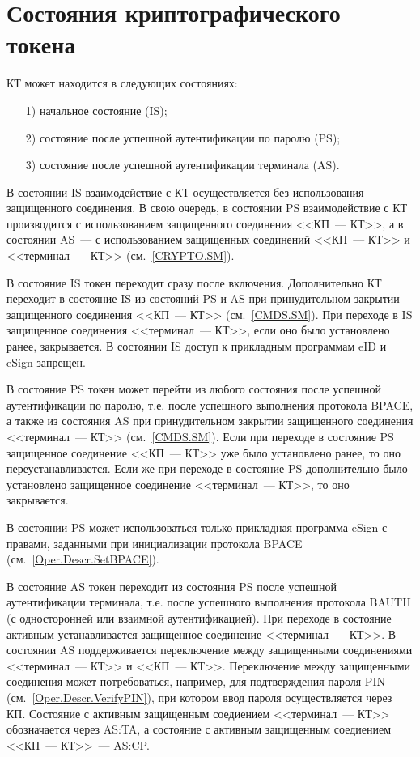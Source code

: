 \chapter{Состояния криптографического токена}\label{STATES}

КТ может находится в следующих состояниях:
%
\begin{itemize}
\item[1)]
начальное состояние (IS);
\item[2)]
состояние после успешной аутентификации по паролю (PS);
\item[3)]
состояние после успешной аутентификации терминала (AS).
\end{itemize}

В состоянии IS взаимодействие с КТ осуществляется без использования 
защищенного соединения. В свою очередь, в состоянии PS взаимодействие 
с КТ производится с использованием защищенного соединения <<КП~--- КТ>>, 
а в состоянии AS~--- с использованием защищенных соединений <<КП~--- КТ>> 
и <<терминал~--- КТ>> (см.~\ref{CRYPTO.SM}).

В состояние IS токен переходит сразу после включения.
Дополнительно КТ переходит в состояние IS из состояний PS и AS
при принудительном закрытии защищенного соединения <<КП~--- КТ>> (см.~\ref{CMDS.SM}).
При переходе в IS защищенное соединения <<терминал~--- КТ>>, 
если оно было установлено ранее, закрывается.
В состоянии IS доступ к прикладным программам eID и eSign запрещен.

В состояние PS токен может перейти из любого состояния 
после успешной аутентификации по паролю, 
т.е. после успешного выполнения протокола BPACE,
а также из состояния AS при принудительном закрытии 
защищенного соединения <<терминал~--- КТ>> (см.~\ref{CMDS.SM}).
Если при переходе в состояние PS защищенное соединение <<КП~--- КТ>> 
уже было установлено ранее, то оно переустанавливается. 
Если же при переходе в состояние PS дополнительно было установлено 
защищенное соединение <<терминал~--- КТ>>, то оно закрывается.

В состоянии PS может использоваться только прикладная программа eSign
с правами, заданными при инициализации протокола BPACE 
(см.~\ref{Oper.Descr.SetBPACE}).

В состояние AS токен переходит из состояния PS 
после успешной аутентификации терминала, т.е. 
после успешного выполнения протокола BAUTH 
(с односторонней или взаимной аутентификацией).
При переходе в состояние активным устанавливается 
защищенное соединение <<терминал~--- КТ>>.
В состоянии AS поддерживается переключение  
между защищенными соединениями <<терминал~--- КТ>> и <<КП~--- КТ>>.
Переключение между защищенными соединения может потребоваться, 
например, для подтверждения пароля PIN (см.~\ref{Oper.Descr.VerifyPIN}), 
при котором ввод пароля осуществляется через КП. 
Состояние с активным защищенным соедиением <<терминал~--- КТ>>
обозначается через AS:TA, 
а состояние с активным защищенным соедиением <<КП~--- КТ>>~--- AS:CP. 

